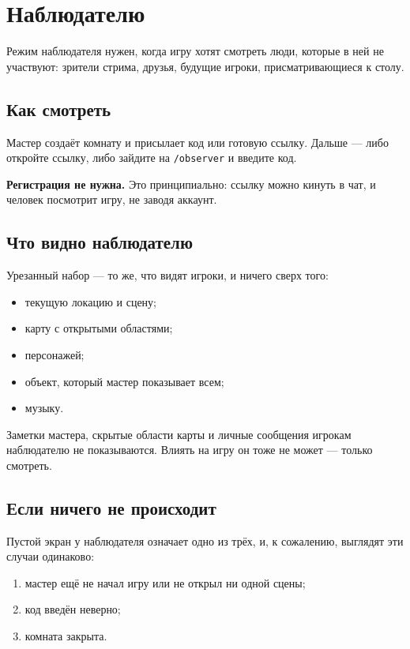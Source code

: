 \chapter{Наблюдателю}
\label{ch:observer}

Режим наблюдателя нужен, когда игру хотят смотреть люди, которые в ней не участвуют: зрители стрима, друзья, будущие игроки, присматривающиеся к столу.

\section{Как смотреть}
\label{sec:observer:watch}

Мастер создаёт комнату и присылает код или готовую ссылку. Дальше --- либо откройте ссылку, либо зайдите на \texttt{/observer} и введите код.


\textbf{Регистрация не нужна.} Это принципиально: ссылку можно кинуть в чат, и человек посмотрит игру, не заводя аккаунт.

\section{Что видно наблюдателю}
\label{sec:observer:visible}

Урезанный набор --- то же, что видят игроки, и ничего сверх того:

\begin{itemize}
\item текущую локацию и сцену;
\item карту с открытыми областями;
\item персонажей;
\item объект, который мастер показывает всем;
\item музыку.
\end{itemize}

Заметки мастера, скрытые области карты и личные сообщения игрокам наблюдателю не показываются. Влиять на игру он тоже не может --- только смотреть.

\section{Если ничего не происходит}
\label{sec:observer:empty}

Пустой экран у наблюдателя означает одно из трёх, и, к сожалению, выглядят эти случаи одинаково:

\begin{enumerate}
\item мастер ещё не начал игру или не открыл ни одной сцены;
\item код введён неверно;
\item комната закрыта.
\end{enumerate}

